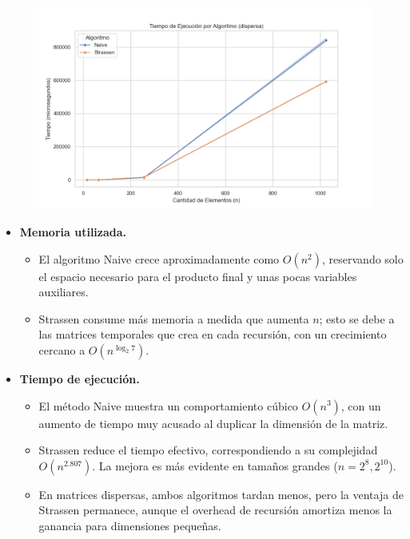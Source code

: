 \begin{figure}[H]
    \centering
    \begin{minipage}[t]{1\textwidth}
        \includegraphics[width=\textwidth]{../code/matrix_multiplication/data/plots/tiempo_vs_algoritmo_dispersa.png}
     \end{minipage}%
    \caption{}
    \label{fig:scatterplot_3}
\end{figure}


\begin{itemize}
  \item \textbf{Memoria utilizada.}  
    \begin{itemize}
      \item El algoritmo Naive crece aproximadamente como \(O(n^2)\), reservando solo el espacio necesario para el producto final y unas pocas variables auxiliares.
      \item Strassen consume más memoria a medida que aumenta \(n\); esto se debe a las matrices temporales que crea en cada recursión, con un crecimiento cercano a \(O(n^{\log_2 7})\).  
    \end{itemize}

  \item \textbf{Tiempo de ejecución.}  
    \begin{itemize}
      \item El método Naive muestra un comportamiento cúbico \(O(n^3)\), con un aumento de tiempo muy acusado al duplicar la dimensión de la matriz.  
      \item Strassen reduce el tiempo efectivo, correspondiendo a su complejidad \(O(n^{2.807})\). La mejora es más evidente en tamaños grandes (\(n=2^8,2^{10}\)).  
      \item En matrices dispersas, ambos algoritmos tardan menos, pero la ventaja de Strassen permanece, aunque el overhead de recursión amortiza menos la ganancia para dimensiones pequeñas.  
    \end{itemize}
\end{itemize}


